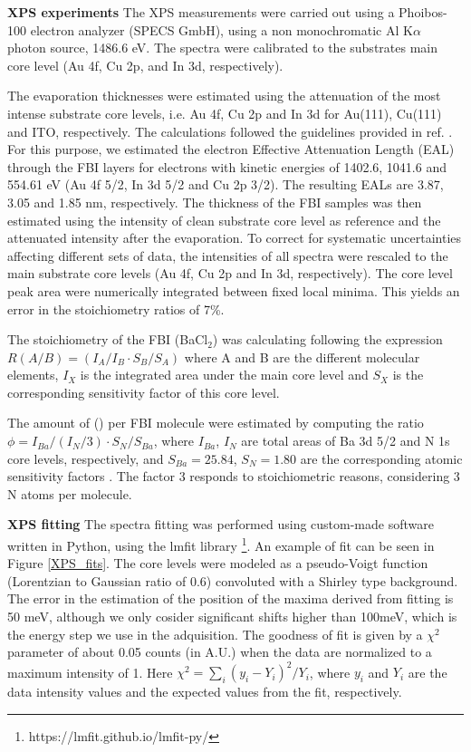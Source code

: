 \documentclass[aps,prl,reprint,longbibliography,superscriptaddress, english]{revtex4-1}
\def\BappCl{BaCl$_2$}
\begin{document}
\textbf{XPS experiments}
The XPS measurements were carried out using a Phoibos-100 electron analyzer (SPECS GmbH), using a non monochromatic Al K$\alpha$ photon source, 1486.6 eV. The spectra were calibrated to the substrates main core level (Au 4f, Cu 2p, and In 3d, respectively). 

The evaporation thicknesses were estimated using the attenuation of the most intense substrate core levels, i.e. Au 4f, Cu 2p and In 3d for Au(111), Cu(111) and ITO, respectively. The calculations followed the guidelines provided in ref. \cite{powell_practical_2020}. For this purpose, we estimated the electron Effective Attenuation Length (EAL) through the FBI layers for electrons with kinetic energies of 1402.6, 1041.6 and 554.61 eV (Au 4f 5/2, In 3d 5/2 and Cu 2p 3/2). The resulting EALs are 3.87, 3.05 and 1.85 nm, respectively. The thickness of the FBI samples was then estimated using the intensity of clean substrate core level as reference and the attenuated intensity after the evaporation. To correct for systematic uncertainties affecting different sets of data, the intensities of all spectra were rescaled to the main substrate core levels (Au 4f, Cu 2p and In 3d, respectively). The core level peak area were numerically integrated between fixed local minima. This yields an error in the stoichiometry ratios of 7\%. 

The stoichiometry of the FBI (\BappCl) was calculating following the expression $ R(A/B)=(I_{A}/I_{B} \cdot S_B/S_{A})$ where A and B are the different molecular elements, $I_{X}$ is the integrated area under the main core level and $S_{X}$ is the corresponding sensitivity factor of this core level.

The amount of \Bapp (\Nap) per FBI molecule were estimated by computing  the ratio $\phi=I_{Ba}/(I_N/3) \cdot S_N/S_{Ba} $, where $I_{Ba}$, $I_N$ are total areas  of Ba 3d 5/2 and  N 1s core  levels, respectively, and $S_{Ba} = 25.84$, $S_N = 1.80$ are the corresponding atomic sensitivity factors \cite{scofield_hartree-slater_1976}. The factor 3 responds to stoichiometric reasons, considering 3 N atoms per molecule.

\textbf{XPS fitting}
The spectra fitting was performed using custom-made software written in Python, using the lmfit library \footnote{https://lmfit.github.io/lmfit-py/}. An example of fit can be seen in Figure \ref{XPS_fits}. The core levels were modeled as a pseudo-Voigt function (Lorentzian to Gaussian ratio of 0.6) convoluted with a Shirley type background. The error in the estimation of the position of the maxima derived from fitting is 50 meV, although we only cosider significant shifts higher than 100meV, which is the energy step we use in the adquisition. The goodness of fit is given by a $\chi^2$ parameter of about 0.05 counts (in A.U.) when the data are normalized to a maximum intensity of 1. Here $\chi^2 = \sum_i (y_i- Y_i)^2/Y_i$, where $y_i$ and $Y_i$ are the data intensity values and the expected values from the fit, respectively.
\end{document}
